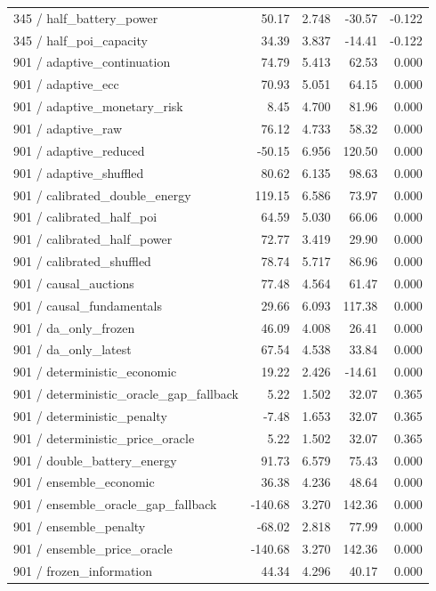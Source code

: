 \begin{longtable}{lrrrr}
345 / half\_battery\_power & 50.17 & 2.748 & -30.57 & -0.122\\
345 / half\_poi\_capacity & 34.39 & 3.837 & -14.41 & -0.122\\
901 / adaptive\_continuation & 74.79 & 5.413 & 62.53 & 0.000\\
901 / adaptive\_ecc & 70.93 & 5.051 & 64.15 & 0.000\\
901 / adaptive\_monetary\_risk & 8.45 & 4.700 & 81.96 & 0.000\\
901 / adaptive\_raw & 76.12 & 4.733 & 58.32 & 0.000\\
901 / adaptive\_reduced & -50.15 & 6.956 & 120.50 & 0.000\\
901 / adaptive\_shuffled & 80.62 & 6.135 & 98.63 & 0.000\\
901 / calibrated\_double\_energy & 119.15 & 6.586 & 73.97 & 0.000\\
901 / calibrated\_half\_poi & 64.59 & 5.030 & 66.06 & 0.000\\
901 / calibrated\_half\_power & 72.77 & 3.419 & 29.90 & 0.000\\
901 / calibrated\_shuffled & 78.74 & 5.717 & 86.96 & 0.000\\
901 / causal\_auctions & 77.48 & 4.564 & 61.47 & 0.000\\
901 / causal\_fundamentals & 29.66 & 6.093 & 117.38 & 0.000\\
901 / da\_only\_frozen & 46.09 & 4.008 & 26.41 & 0.000\\
901 / da\_only\_latest & 67.54 & 4.538 & 33.84 & 0.000\\
901 / deterministic\_economic & 19.22 & 2.426 & -14.61 & 0.000\\
901 / deterministic\_oracle\_gap\_fallback & 5.22 & 1.502 & 32.07 & 0.365\\
901 / deterministic\_penalty & -7.48 & 1.653 & 32.07 & 0.365\\
901 / deterministic\_price\_oracle & 5.22 & 1.502 & 32.07 & 0.365\\
901 / double\_battery\_energy & 91.73 & 6.579 & 75.43 & 0.000\\
901 / ensemble\_economic & 36.38 & 4.236 & 48.64 & 0.000\\
901 / ensemble\_oracle\_gap\_fallback & -140.68 & 3.270 & 142.36 & 0.000\\
901 / ensemble\_penalty & -68.02 & 2.818 & 77.99 & 0.000\\
901 / ensemble\_price\_oracle & -140.68 & 3.270 & 142.36 & 0.000\\
901 / frozen\_information & 44.34 & 4.296 & 40.17 & 0.000\\

\end{longtable}
